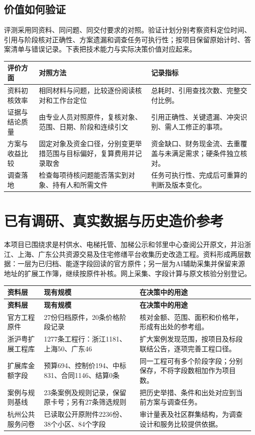 \documentclass[UTF8,11pt,fontset=windows]{ctexart}
\begin{document}
\subsection{价值如何验证}

评测采用同资料、同问题、同交付要求的对照。验证计划分别考察资料定位时间、引用与阶段核对正确性、方案遗漏和调查任务可执行性；按项目保留原始计时、答案清单与错误记录。下表把技术能力与实际决策价值对应起来。
\begin{longtable}{@{}L{33mm}L{70mm}L{56mm}@{}}
\toprule\textbf{评价方面}&\textbf{对照方法}&\textbf{记录指标}\\\midrule
资料初核效率&相同材料与问题，比较逐份阅读核对和工作台定位&总耗时、引用查找次数、完整交付比例。\\
证据与结论质量&由专业人员对照原件，复核对象、范围、日期、阶段和连续引文&引用正确性、关键遗漏、冲突识别、需人工修正的事项。\\
方案与收益比较&固定对象及资金口径，分别变更举措范围与目标偏好，复算费用并记录取舍&资金缺口、财务现金流、去重覆盖与未满足需求；硬条件独立核对。\\
调查落地&检查每项待核问题能否落实到对象、持有人和所需文件&任务可执行性、完成后可重算的判断及版本变化。\\
\bottomrule\end{longtable}


\section{已有调研、真实数据与历史造价参考}

本项目已围绕求是村供水、电梯托管、加梯公示和邻里中心查阅公开原文，并沿浙江、上海、广东公共资源交易及住宅修缮平台收集历史改造工程。资料形成两层数据：一层为已归档、能逐字段回读的官方原件；另一层为AI辅助采集并保留来源地址的扩展工作簿，继续按原件补核。网上采集、字段计算与原文核验分别登记。

\begin{longtable}{@{}L{37mm}L{63mm}L{59mm}@{}}
\toprule\textbf{资料层}&\textbf{现有规模}&\textbf{在决策中的用途}\\\midrule
\endfirsthead
\toprule\textbf{资料层}&\textbf{现有规模}&\textbf{在决策中的用途}\\\midrule
\endhead
官方工程原件&27份归档原件，20条价格阶段记录&核对金额、范围、面积和价格年，形成有出处的参考组。\\
浙沪粤扩展工程库&1277条工程行：浙江1181、上海50、广东46&扩大案例发现范围，按项目及标段联结公告，逐项完善工程口径。\\
扩展库金额字段&预算694、控制价194、中标831、合同1146、结算0条&同一工程可有多个阶段字段；分别保存，不将字段数相加作为项目数。\\
案例与规则基线&23条案例及规则记录，保留原卡号；另有27条筛选规则&把历史举措、条件和出处对应到当前方案与调查任务。\\
杭州公共服务问卷&已读取公开原附件2236份、38个小区、84个字段&审计量表及社区群集结构，为调查设计和服务比较提供依据。\\
\bottomrule\end{longtable}
\end{document}
